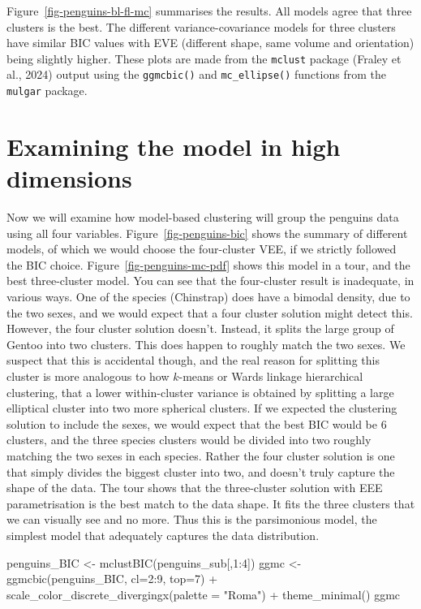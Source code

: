 \documentclass[
  letterpaper,
]{krantz}
\newenvironment{Shaded}{\begin{snugshade}}{\end{snugshade}}
\newcommand{\AttributeTok}[1]{\textcolor[rgb]{0.40,0.45,0.13}{#1}}
\newcommand{\DecValTok}[1]{\textcolor[rgb]{0.68,0.00,0.00}{#1}}
\newcommand{\FunctionTok}[1]{\textcolor[rgb]{0.28,0.35,0.67}{#1}}
\newcommand{\NormalTok}[1]{\textcolor[rgb]{0.00,0.23,0.31}{#1}}
\newcommand{\OtherTok}[1]{\textcolor[rgb]{0.00,0.23,0.31}{#1}}
\newcommand{\SpecialCharTok}[1]{\textcolor[rgb]{0.37,0.37,0.37}{#1}}
\newcommand{\StringTok}[1]{\textcolor[rgb]{0.13,0.47,0.30}{#1}}
\begin{document}
Figure~\ref{fig-penguins-bl-fl-mc} summarises the results. All models
agree that three clusters is the best. The different variance-covariance
models for three clusters have similar BIC values with EVE (different
shape, same volume and orientation) being slightly higher. These plots
are made from the \texttt{mclust} package (Fraley et al., 2024) output
using the \texttt{ggmcbic()} and \texttt{mc\_ellipse()} functions from
the \texttt{mulgar} package.

\section{Examining the model in high
dimensions}\label{examining-the-model-in-high-dimensions}

Now we will examine how model-based clustering will group the penguins
data using all four variables. Figure~\ref{fig-penguins-bic} shows the
summary of different models, of which we would choose the four-cluster
VEE, if we strictly followed the BIC choice.
Figure~\ref{fig-penguins-mc-pdf} shows this model in a tour, and the
best three-cluster model. You can see that the four-cluster result is
inadequate, in various ways. One of the species (Chinstrap) does have a
bimodal density, due to the two sexes, and we would expect that a four
cluster solution might detect this. However, the four cluster solution
doesn't. Instead, it splits the large group of Gentoo into two clusters.
This does happen to roughly match the two sexes. We suspect that this is
accidental though, and the real reason for splitting this cluster is
more analogous to how \(k\)-means or Wards linkage hierarchical
clustering, that a lower within-cluster variance is obtained by
splitting a large elliptical cluster into two more spherical clusters.
If we expected the clustering solution to include the sexes, we would
expect that the best BIC would be 6 clusters, and the three species
clusters would be divided into two roughly matching the two sexes in
each species. Rather the four cluster solution is one that simply
divides the biggest cluster into two, and doesn't truly capture the
shape of the data. The tour shows that the three-cluster solution with
EEE parametrisation is the best match to the data shape. It fits the
three clusters that we can visually see and no more. Thus this is the
parsimonious model, the simplest model that adequately captures the data
distribution. 

\begin{Shaded}
\begin{Highlighting}[]
\NormalTok{penguins\_BIC }\OtherTok{\textless{}{-}} \FunctionTok{mclustBIC}\NormalTok{(penguins\_sub[,}\DecValTok{1}\SpecialCharTok{:}\DecValTok{4}\NormalTok{])}
\NormalTok{ggmc }\OtherTok{\textless{}{-}} \FunctionTok{ggmcbic}\NormalTok{(penguins\_BIC, }\AttributeTok{cl=}\DecValTok{2}\SpecialCharTok{:}\DecValTok{9}\NormalTok{, }\AttributeTok{top=}\DecValTok{7}\NormalTok{) }\SpecialCharTok{+} 
  \FunctionTok{scale\_color\_discrete\_divergingx}\NormalTok{(}\AttributeTok{palette =} \StringTok{"Roma"}\NormalTok{) }\SpecialCharTok{+}
  \FunctionTok{theme\_minimal}\NormalTok{() }
\NormalTok{ggmc}
\end{Highlighting}
\end{Shaded}
\end{document}
